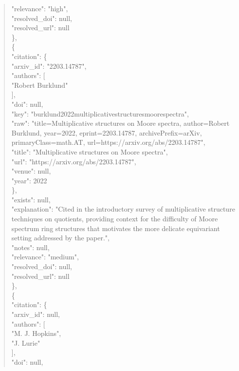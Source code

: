 \documentclass[11pt]{article}
\begin{document}
\begin{quote}
      "relevance": "high",\\
      "resolved\_doi": null,\\
      "resolved\_url": null\\
    \},\\
    \{\\
      "citation": \{\\
        "arxiv\_id": "2203.14787",\\
        "authors": [\\
          "Robert Burklund"\\
        ],\\
        "doi": null,\\
        "key": "burklund2022multiplicativestructuresmoorespectra",\\
        "raw": "title=Multiplicative structures on Moore spectra, author=Robert Burklund, year=2022, eprint=2203.14787, archivePrefix=arXiv, primaryClass=math.AT, url=https://arxiv.org/abs/2203.14787",\\
        "title": "Multiplicative structures on Moore spectra",\\
        "url": "https://arxiv.org/abs/2203.14787",\\
        "venue": null,\\
        "year": 2022\\
      \},\\
      "exists": null,\\
      "explanation": "Cited in the introductory survey of multiplicative structure techniques on quotients, providing context for the difficulty of Moore spectrum ring structures that motivates the more delicate equivariant setting addressed by the paper.",\\
      "notes": null,\\
      "relevance": "medium",\\
      "resolved\_doi": null,\\
      "resolved\_url": null\\
    \},\\
    \{\\
      "citation": \{\\
        "arxiv\_id": null,\\
        "authors": [\\
          "M. J. Hopkins",\\
          "J. Lurie"\\
        ],\\
        "doi": null,\\

\end{quote}
\end{document}
